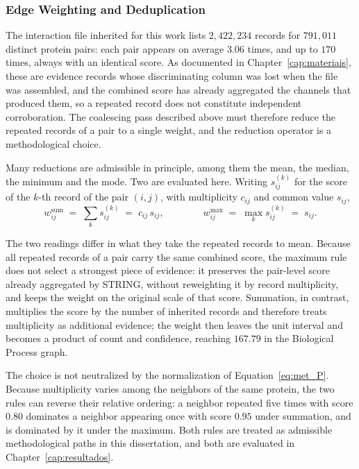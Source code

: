 \documentclass[Ingles]{ic-tese-v3}
\begin{document}
\subsubsection{Edge Weighting and Deduplication}
\label{sec:met_dedup}

The interaction file inherited for this work lists $2{,}422{,}234$ records for $791{,}011$ distinct
protein pairs: each pair appears on average $3.06$ times, and up to $170$ times, always with an
identical score. As documented in Chapter~\ref{cap:materiais}, these are evidence records whose
discriminating column was lost when the file was assembled, and the combined score has already
aggregated the channels that produced them, so a repeated record does not constitute independent
corroboration. The coalescing pass described above must therefore reduce the repeated
records of a pair to a single weight, and the reduction operator is a methodological choice.

Many reductions are admissible in principle, among them the mean, the median, the minimum and the
mode. Two are evaluated here. Writing $s^{(k)}_{ij}$ for the score of the $k$-th record of the pair
$(i,j)$, with multiplicity $c_{ij}$ and common value $s_{ij}$,
\begin{equation}
  w^{\text{sum}}_{ij} \;=\; \sum_{k} s^{(k)}_{ij} \;=\; c_{ij}\, s_{ij},
  \qquad\qquad
  w^{\max}_{ij} \;=\; \max_{k} s^{(k)}_{ij} \;=\; s_{ij}.
  \label{eq:met_dedup}
\end{equation}

The two readings differ in what they take the repeated records to mean. Because all repeated
records of a pair carry the same combined score, the maximum rule does not select a strongest piece
of evidence: it preserves the pair-level score already aggregated by STRING, without reweighting it
by record multiplicity, and keeps the weight on the original scale of that score. Summation, in
contrast, multiplies the score by the number of inherited records and therefore treats multiplicity
as additional evidence; the weight then leaves the unit interval and becomes a product of count and
confidence, reaching $167.79$ in the Biological Process graph.

The choice is not neutralized by the normalization of Equation~\eqref{eq:met_P}. Because
multiplicity varies among the neighbors of the same protein, the two rules can reverse their
relative ordering: a neighbor repeated five times with score $0.80$ dominates a neighbor appearing
once with score $0.95$ under summation, and is dominated by it under the maximum. Both rules are
treated as admissible methodological paths in this dissertation, and both are evaluated in
Chapter~\ref{cap:resultados}.
\end{document}
